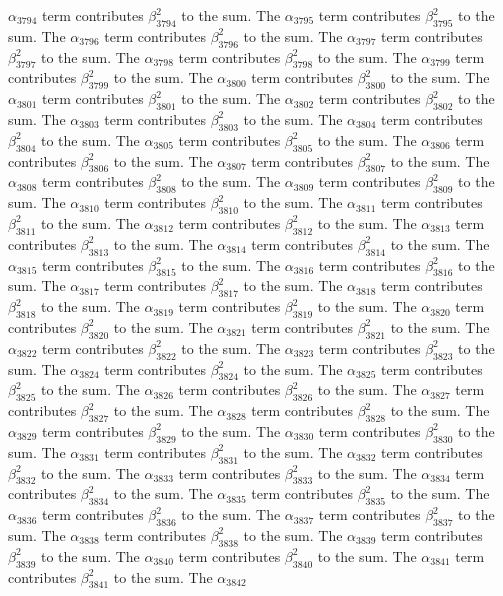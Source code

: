 \begin{lemma}
$\alpha_{3794}$ term contributes $\beta_{3794}^{2}$ to the sum. The $\alpha_{3795}$ term contributes $\beta_{3795}^{2}$ to the sum. The $\alpha_{3796}$ term contributes $\beta_{3796}^{2}$ to the sum. The $\alpha_{3797}$ term contributes $\beta_{3797}^{2}$ to the sum. The $\alpha_{3798}$ term contributes $\beta_{3798}^{2}$ to the sum. The $\alpha_{3799}$ term contributes $\beta_{3799}^{2}$ to the sum. The $\alpha_{3800}$ term contributes $\beta_{3800}^{2}$ to the sum. The $\alpha_{3801}$ term contributes $\beta_{3801}^{2}$ to the sum. The $\alpha_{3802}$ term contributes $\beta_{3802}^{2}$ to the sum. The $\alpha_{3803}$ term contributes $\beta_{3803}^{2}$ to the sum. The $\alpha_{3804}$ term contributes $\beta_{3804}^{2}$ to the sum. The $\alpha_{3805}$ term contributes $\beta_{3805}^{2}$ to the sum. The $\alpha_{3806}$ term contributes $\beta_{3806}^{2}$ to the sum. The $\alpha_{3807}$ term contributes $\beta_{3807}^{2}$ to the sum. The $\alpha_{3808}$ term contributes $\beta_{3808}^{2}$ to the sum. The $\alpha_{3809}$ term contributes $\beta_{3809}^{2}$ to the sum. The $\alpha_{3810}$ term contributes $\beta_{3810}^{2}$ to the sum. The $\alpha_{3811}$ term contributes $\beta_{3811}^{2}$ to the sum. The $\alpha_{3812}$ term contributes $\beta_{3812}^{2}$ to the sum. The $\alpha_{3813}$ term contributes $\beta_{3813}^{2}$ to the sum. The $\alpha_{3814}$ term contributes $\beta_{3814}^{2}$ to the sum. The $\alpha_{3815}$ term contributes $\beta_{3815}^{2}$ to the sum. The $\alpha_{3816}$ term contributes $\beta_{3816}^{2}$ to the sum. The $\alpha_{3817}$ term contributes $\beta_{3817}^{2}$ to the sum. The $\alpha_{3818}$ term contributes $\beta_{3818}^{2}$ to the sum. The $\alpha_{3819}$ term contributes $\beta_{3819}^{2}$ to the sum. The $\alpha_{3820}$ term contributes $\beta_{3820}^{2}$ to the sum. The $\alpha_{3821}$ term contributes $\beta_{3821}^{2}$ to the sum. The $\alpha_{3822}$ term contributes $\beta_{3822}^{2}$ to the sum. The $\alpha_{3823}$ term contributes $\beta_{3823}^{2}$ to the sum. The $\alpha_{3824}$ term contributes $\beta_{3824}^{2}$ to the sum. The $\alpha_{3825}$ term contributes $\beta_{3825}^{2}$ to the sum. The $\alpha_{3826}$ term contributes $\beta_{3826}^{2}$ to the sum. The $\alpha_{3827}$ term contributes $\beta_{3827}^{2}$ to the sum. The $\alpha_{3828}$ term contributes $\beta_{3828}^{2}$ to the sum. The $\alpha_{3829}$ term contributes $\beta_{3829}^{2}$ to the sum. The $\alpha_{3830}$ term contributes $\beta_{3830}^{2}$ to the sum. The $\alpha_{3831}$ term contributes $\beta_{3831}^{2}$ to the sum. The $\alpha_{3832}$ term contributes $\beta_{3832}^{2}$ to the sum. The $\alpha_{3833}$ term contributes $\beta_{3833}^{2}$ to the sum. The $\alpha_{3834}$ term contributes $\beta_{3834}^{2}$ to the sum. The $\alpha_{3835}$ term contributes $\beta_{3835}^{2}$ to the sum. The $\alpha_{3836}$ term contributes $\beta_{3836}^{2}$ to the sum. The $\alpha_{3837}$ term contributes $\beta_{3837}^{2}$ to the sum. The $\alpha_{3838}$ term contributes $\beta_{3838}^{2}$ to the sum. The $\alpha_{3839}$ term contributes $\beta_{3839}^{2}$ to the sum. The $\alpha_{3840}$ term contributes $\beta_{3840}^{2}$ to the sum. The $\alpha_{3841}$ term contributes $\beta_{3841}^{2}$ to the sum. The $\alpha_{3842}$ 
\end{lemma}
